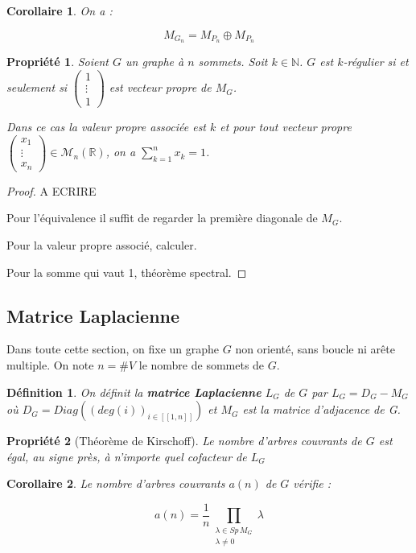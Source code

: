 \documentclass[french,a4paper]{article}
\newtheorem{definition}{Définition}[section]
\newtheorem{property}{Propriété}[section]
\newtheorem{proof}{Preuve}[section]
\newtheorem{corollary}{Corollaire}[section]
\begin{document}
\begin{corollary}
On a :

\[
M_{G_n}=M_{P_n} \oplus M_{P_n}
\]
\end{corollary}

\begin{property}
Soient $G$ un graphe à $n$ sommets. Soit $k \in \mathbb{N}$.
$G$ est $k$-régulier si et seulement si $\begin{pmatrix} 1 \\ \vdots \\ 1 \end{pmatrix}$ est vecteur propre de $M_G$.

Dans ce cas la valeur propre associée est $k$ et pour tout vecteur propre $\begin{pmatrix} x_1 \\ \vdots \\ x_n \end{pmatrix} \in \mathcal{M}_{n}(\mathbb{R})$, on a $\sum\limits_{k=1}^{n} x_k = 1$.
\end{property}

\begin{proof}
A ECRIRE

Pour l'équivalence il suffit de regarder la première diagonale de $M_G$.

Pour la valeur propre associé, calculer.

Pour la somme qui vaut 1, théorème spectral.
\end{proof}

\subsection{Matrice Laplacienne}
Dans toute cette section, on fixe un graphe $G$ non orienté, sans boucle ni arête multiple. On note $n=\# V$ le nombre de sommets de $G$.

\begin{definition}
On définit la \textbf{matrice Laplacienne} $L_{G}$ de $G$ par $L_{G}=D_{G}-M_{G}$ où $D_{G}=Diag((deg(i))_{i \in [\! [1,n]\! ]})$ et $M_{G}$ est la matrice d'adjacence de G.
\end{definition}

\begin{property}[Théorème de Kirschoff]
Le nombre d'arbres couvrants de $G$ est égal, au signe près, à n'importe quel cofacteur de $L_{G}$
\end{property}

\begin{corollary}
Le nombre d'arbres couvrants $a(n)$ de $G$ vérifie :

\[
a(n)=\frac{1}{n} \prod_{\substack{\lambda \in Sp \, M_G \\ \lambda \neq 0}} \lambda
\]
\end{corollary}
\end{document}

